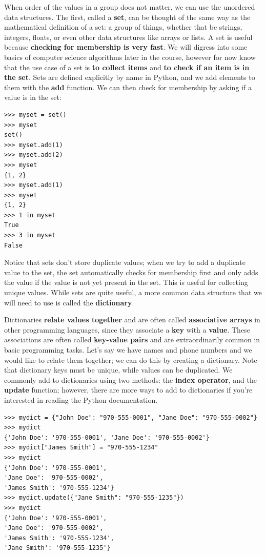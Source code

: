 \documentclass[a4paper,11pt]{article}
\begin{document}
When order of the values in a group does not matter, we can use the unordered data structures.  The first, 
called a \textbf{set}, can be thought of the same way as the mathematical definition of a set: a group 
of things, whether that be strings, integers, floats, or even other data structures like arrays or lists.  
A set is useful because \textbf{checking for membership is very fast}.  We will digress into some basics 
of computer science algorithms later in the course, however for now know that the use case of a set is 
\textbf{to collect items} and \textbf{to check if an item is in the set}.  Sets are defined explicitly 
by name in Python, and we add elements to them with the \textbf{add} function.  We can then check for 
membership by asking if a value is in the set:

\vspace{3mm}
\begin{lstlisting}
>>> myset = set()
>>> myset
set()
>>> myset.add(1)
>>> myset.add(2)
>>> myset
{1, 2}
>>> myset.add(1)
>>> myset
{1, 2}
>>> 1 in myset
True
>>> 3 in myset
False
\end{lstlisting}
\vspace{3mm}

Notice that sets don't store duplicate values; when we try to add a duplicate value to the set, the set 
automatically checks for membership first and only adds the value if the value is not yet present in 
the set.  This is useful for collecting unique values.  While sets are quite useful, a more common 
data structure that we will need to use is called the \textbf{dictionary}. \par

Dictionaries \textbf{relate values together} and are often called \textbf{associative arrays} in other 
programming languages, since they associate a \textbf{key} with a \textbf{value}.  These associations 
are often called \textbf{key-value pairs} and are extraordinarily common in basic programming tasks.  
Let's say we have names and phone numbers and we would like to relate them together; we can do this 
by creating a dictionary.  Note that dictionary keys must be unique, while values can be duplicated.  
We commonly add to dictionaries using two methods: the \textbf{index operator}, 
and the \textbf{update} function; however, there are more ways to add to dictionaries if you're interested 
in reading the Python documentation.

\vspace{3mm}
\begin{lstlisting}
>>> mydict = {"John Doe": "970-555-0001", "Jane Doe": "970-555-0002"}
>>> mydict
{'John Doe': '970-555-0001', 'Jane Doe': '970-555-0002'}
>>> mydict["James Smith"] = "970-555-1234"
>>> mydict
{'John Doe': '970-555-0001', 
'Jane Doe': '970-555-0002', 
'James Smith': '970-555-1234'}
>>> mydict.update({"Jane Smith": "970-555-1235"})
>>> mydict
{'John Doe': '970-555-0001', 
'Jane Doe': '970-555-0002', 
'James Smith': '970-555-1234', 
'Jane Smith': '970-555-1235'}
\end{lstlisting}
\vspace{3mm}
\end{document}
